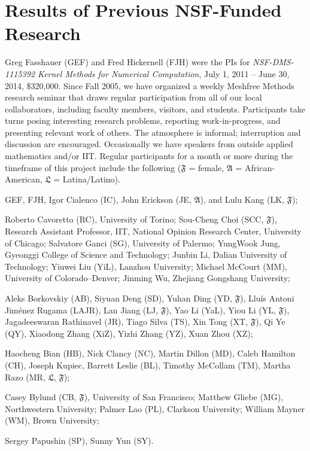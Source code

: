 \documentclass[11pt]{NSFamsart}
\newcommand{\fA}{\mathfrak{A}}
\newcommand{\fF}{\mathfrak{F}}
\newcommand{\fL}{\mathfrak{L}}
\begin{document}
\section{Results of Previous NSF-Funded Research}\label{SectPrevious}

Greg Fasshauer (GEF) and Fred Hickernell (FJH) were the PIs for \emph{NSF-DMS-1115392 Kernel Methods for Numerical Computation}, July 1, 2011 -- June 30, 2014, \$320,000.  Since Fall 2005, we have organized a weekly Meshfree Methods research seminar that draws regular participation from all of our local collaborators, including faculty members, visitors, and students.  Participants take turns posing interesting research problems, reporting work-in-progress, and presenting relevant work of others.  The atmosphere is informal; interruption and discussion are encouraged.  Occasionally we have speakers from outside applied mathematics and/or IIT. Regular participants for a month or more during the timeframe of this project include the following ($\fF$ = female,  $\fA$ = African-American, $\fL$ = Latina/Latino).

\begin{description}[leftmargin=2.5ex]
\item[IIT Full-Time Faculty] GEF, FJH, Igor Cialenco (IC), John Erickson (JE, $\fA$), and Lulu Kang (LK, $\fF$);
\item[Visitors] Roberto Cavoretto (RC), University of Torino; Sou-Cheng Choi (SCC, $\fF$), Research Assistant Professor, IIT, National Opinion Research Center, University of Chicago; Salvatore Ganci (SG), University of Palermo; YungWook Jung, Gyeonggi College of Science and Technology; Junbin Li, Dalian University of Technology; Yiuwei Liu (YiL), Lanzhou University; Michael McCourt (MM), University of Colorado--Denver; Jinming Wu, Zhejiang Gongshang University;
\item[IIT Graduate Students] Aleks Borkovskiy (AB), Siyuan Deng (SD), Yuhan Ding (YD, $\fF$), Llu\'is Antoni Jim\'enez Rugama (LAJR), Lan Jiang (LJ, $\fF$), Yao Li (YaL), Yiou Li (YL, $\fF$), Jagadeeswaran Rathinavel (JR), Tiago Silva (TS), Xin Tong (XT, $\fF$), Qi Ye (QY), Xiaodong Zhang (XiZ), Yizhi Zhang (YZ), Xuan Zhou (XZ);
\item[IIT Undergraduate Students] Haocheng Bian (HB), Nick Clancy (NC), Martin Dillon (MD), Caleb Hamilton (CH), Joseph Kupiec, Barrett Leslie (BL), Timothy McCollam (TM), Martha Razo (MR, $\fL$, $\fF$);
\item[Other Undergraduate Students] Casey Bylund (CB, $\fF$), University of San Francisco; Matthew Gliebe (MG), Northwestern University; Palmer Lao (PL), Clarkson University; William Mayner (WM), Brown University;
\item[High School Students] Sergey Papushin (SP), Sunny Yun (SY).
\end{description}
\end{document}
